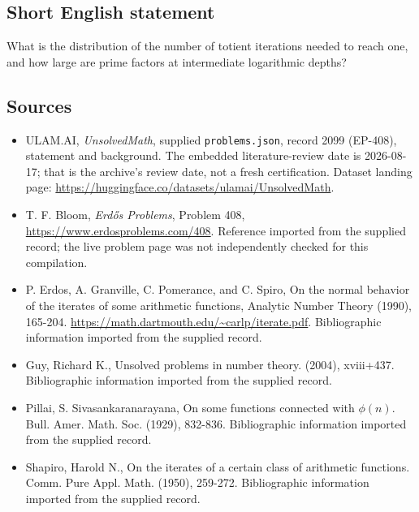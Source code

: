 \documentclass[11pt,a4paper]{article}
\begin{document}
\subsection{Short English statement}

What is the distribution of the number of totient iterations needed to reach one, and how large are prime factors at intermediate logarithmic depths?

\subsection{Sources}

{\small

\begin{itemize}

\item[\hypertarget{source:2099:1}{S1}] ULAM.AI, \emph{UnsolvedMath}, supplied \texttt{problems.json}, record 2099 (EP-408), statement and background. The embedded literature-review date is 2026-08-17; that is the archive’s review date, not a fresh certification. Dataset landing page: \url{https://huggingface.co/datasets/ulamai/UnsolvedMath}.

\item[\hypertarget{source:2099:2}{S2}] T. F. Bloom, \emph{Erdős Problems}, Problem 408, \url{https://www.erdosproblems.com/408}. Reference imported from the supplied record; the live problem page was not independently checked for this compilation.

\item[\hypertarget{source:2099:3}{S3}] P. Erdos, A. Granville, C. Pomerance, and C. Spiro, On the normal behavior of the iterates of some arithmetic functions, Analytic Number Theory (1990), 165-204. \url{https://math.dartmouth.edu/~carlp/iterate.pdf}. Bibliographic information imported from the supplied record.

\item[\hypertarget{source:2099:4}{S4}] Guy, Richard K., Unsolved problems in number theory. (2004), xviii+437. Bibliographic information imported from the supplied record.

\item[\hypertarget{source:2099:5}{S5}] Pillai, S. Sivasankaranarayana, On some functions connected with {$\phi(n)$}. Bull. Amer. Math. Soc. (1929), 832-836. Bibliographic information imported from the supplied record.

\item[\hypertarget{source:2099:6}{S6}] Shapiro, Harold N., On the iterates of a certain class of arithmetic functions. Comm. Pure Appl. Math. (1950), 259-272. Bibliographic information imported from the supplied record.

\end{itemize}

}

\label{end:2099}
\end{document}
